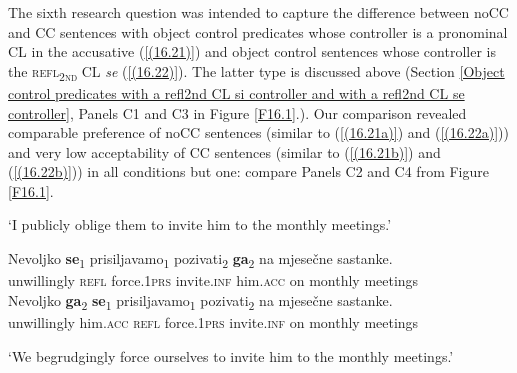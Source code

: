 The sixth research question was intended to capture the difference between noCC and CC sentences with object control predicates whose controller is a pronominal CL in the accusative (\ref{(16.21)}) and object control sentences whose controller is the \textsc{refl\textsubscript{2nd}} CL \textit{se} (\ref{(16.22)}). The latter type is discussed above (Section \ref{Object control predicates with a refl2nd CL si controller and with a refl2nd CL se controller}, Panels C1 and C3 in Figure \ref{F16.1}.). Our comparison revealed comparable preference of noCC sentences (similar to (\ref{(16.21a)}) and (\ref{(16.22a)})) and very low acceptability of CC sentences (similar to (\ref{(16.21b)}) and (\ref{(16.22b)})) in all conditions but one: compare Panels C2 and C4 from Figure \ref{F16.1}. 

\begin{exe}\ex\label{(16.21)}
\begin{xlist}
\end{xlist}
\glt ‘I publicly oblige them to invite him to the monthly meetings.’

\ex\label{(16.22)}\begin{xlist}
\ex\label{(16.22a)}
\gll Nevoljko \textbf{se}\textsubscript{1} prisiljavamo\textsubscript{1} pozivati\textsubscript{2} \textbf{ga}\textsubscript{2} na mjesečne sastanke.\\
 unwillingly \textsc{refl} force.1\textsc{prs} invite.\textsc{inf} him.\textsc{acc} on monthly meetings\\
\ex\label{(16.22b)}
\gll Nevoljko \textbf{ga}\textsubscript{2} \textbf{se}\textsubscript{1} prisiljavamo\textsubscript{1} pozivati\textsubscript{2} na mjesečne sastanke.\\
 unwillingly him.\textsc{acc} \textsc{refl} force.1\textsc{prs} invite.\textsc{inf} on monthly meetings\\
\end{xlist}\glt ‘We begrudgingly force ourselves to invite him to the monthly meetings.’
\end{exe}


